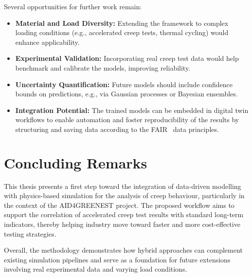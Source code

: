 \documentclass[class=scrbook, crop=false]{standalone}
\begin{document}
Several opportunities for further work remain:

\begin{itemize}
	\item \textbf{Material and Load Diversity:} Extending the framework to complex loading conditions (e.g., accelerated creep tests, thermal cycling) would enhance applicability.
	
	\item \textbf{Experimental Validation:} Incorporating real creep test data would help benchmark and calibrate the models, improving reliability.
	
	\item \textbf{Uncertainty Quantification:} Future models should include confidence bounds on predictions, e.g., via Gaussian processes or Bayesian ensembles.
	
	\item \textbf{Integration Potential:} The trained models can be embedded in digital twin workflows to enable automation and foster reproducibility of the results by structuring and saving data according to the FAIR~\cite{wilkinson2016fair} data principles.
\end{itemize}

\section{Concluding Remarks}

This thesis presents a first step toward the integration of data-driven modelling with physics-based simulation for the analysis of creep behaviour, particularly in the context of the AID4GREENEST project. The proposed workflow aims to support the correlation of accelerated creep test results with standard long-term indicators, thereby helping industry move toward faster and more cost-effective testing strategies.

Overall, the methodology demonstrates how hybrid approaches can complement existing simulation pipelines and serve as a foundation for future extensions involving real experimental data and varying load conditions.
\end{document}
